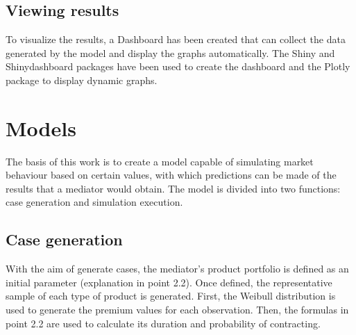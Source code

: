 \documentclass[review]{elsarticle}
\begin{document}
\subsection{Viewing results}
To visualize the results, a Dashboard has been created that can collect the data generated by the model and display the graphs automatically. The Shiny \cite{chang2022shiny} and Shinydashboard\cite{chang2021shinydashboard} packages have been used to create the dashboard and the Plotly package to display dynamic graphs.




\section{Models}

The basis of this work is to create a model capable of simulating market behaviour based on certain values, with which predictions can be made of the results that a mediator would obtain. The model is divided into two functions: case generation and simulation execution.

\subsection{Case generation}

With the aim of generate cases, the mediator's product portfolio is defined as an initial parameter (explanation in point 2.2). Once defined, the representative sample of each type of product is generated. First, the Weibull distribution is used to generate the premium values for each observation. Then, the formulas in point 2.2 are used to calculate its duration and probability of contracting.
\end{document}
